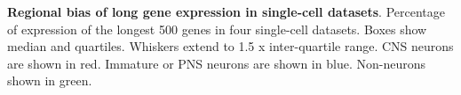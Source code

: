 \textbf{Regional bias of long gene expression in single-cell datasets}. Percentage of expression of the longest 500 genes in four single-cell datasets. Boxes show median and quartiles. Whiskers extend to 1.5 x inter-quartile range. CNS neurons are shown in red. Immature or PNS neurons are shown in blue. Non-neurons shown in green.

